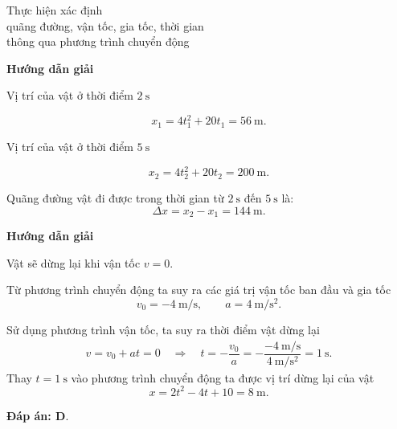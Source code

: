 \begin{dang}{Thực hiện xác định \\quãng đường, vận tốc, gia tốc, thời gian \\thông qua phương trình chuyển động }
	{	\begin{center}
			\textbf{Hướng dẫn giải}
		\end{center}
		
		Vị trí của vật ở thời điểm  $\SI{2}{\second}$  
		
		$$x_1 = 4t_1^2 + 20t_1 =\SI{56}{\meter}.$$
		
		Vị trí của vật ở thời điểm  $\SI{5}{\second}$ 
		
		$$x_2 = 4t_2^2 + 20t_2 =\SI{200}{\meter}.$$
		
		Quãng đường vật đi được trong thời gian từ $\SI{2}{\second}$  đến $\SI{5}{\second}$ là:
		$$\Delta x = x_2 - x_1 = \SI{144}{\meter}.$$
		
	}
	{	\begin{center}
			\textbf{Hướng dẫn giải}
		\end{center}
		
		Vật sẽ dừng lại khi vận tốc $v = 0$.
		
		Từ phương trình chuyển động ta suy ra các giá trị vận tốc ban đầu và gia tốc 
			$$v_0=\SI{-4}{\meter/\second},	\qquad a=\SI{4}{\meter/\second^{2}}.$$
		
		Sử dụng phương trình vận tốc, ta suy ra thời điểm vật dừng lại
			\begin{align*}
				v=v_0+at=0 \quad\Rightarrow\quad t=-\dfrac{v_0}{a}=-\dfrac{\SI{-4}{\meter/	\second}}{\SI{4}{\meter/\second^{2}}}=\SI{1}{\second}.
			\end{align*}		
		Thay $t =\SI{1}{\second}$ vào phương trình chuyển động ta được vị trí dừng lại của vật 
		$$x = 2t^2 - 4t + 10=\SI{8}{\meter}.$$
		
		\textbf{Đáp án: D}.
	}
\end{dang}


